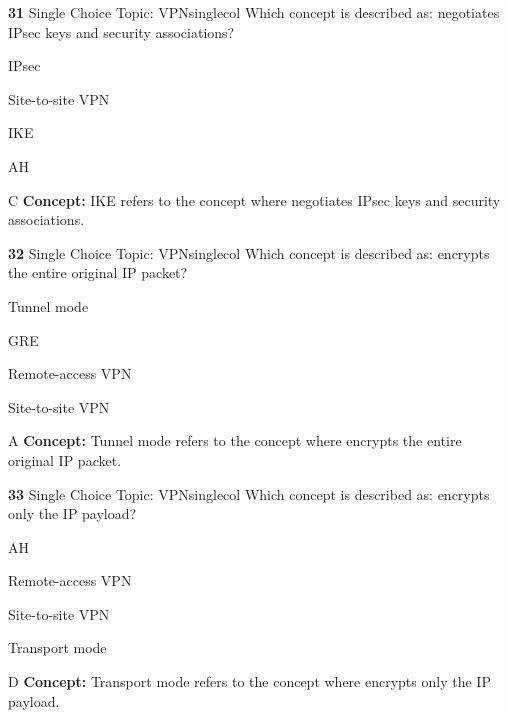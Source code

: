 \documentclass[10pt,a4paper]{article}
\begin{document}
\begin{qcard}{\color{white}\textbf{31} \hfill \small Single Choice \textbar{} Topic: VPN}{singlecol}
Which concept is described as: negotiates IPsec keys and security associations?

\begin{qoptions}
\item IPsec
\item Site-to-site VPN
\item IKE
\item AH
\end{qoptions}
\begin{explainbox}{C}
\textbf{Concept:} IKE refers to the concept where negotiates IPsec keys and security associations.
\end{explainbox}
\end{qcard}

\begin{qcard}{\color{white}\textbf{32} \hfill \small Single Choice \textbar{} Topic: VPN}{singlecol}
Which concept is described as: encrypts the entire original IP packet?

\begin{qoptions}
\item Tunnel mode
\item GRE
\item Remote-access VPN
\item Site-to-site VPN
\end{qoptions}
\begin{explainbox}{A}
\textbf{Concept:} Tunnel mode refers to the concept where encrypts the entire original IP packet.
\end{explainbox}
\end{qcard}

\begin{qcard}{\color{white}\textbf{33} \hfill \small Single Choice \textbar{} Topic: VPN}{singlecol}
Which concept is described as: encrypts only the IP payload?

\begin{qoptions}
\item AH
\item Remote-access VPN
\item Site-to-site VPN
\item Transport mode
\end{qoptions}
\begin{explainbox}{D}
\textbf{Concept:} Transport mode refers to the concept where encrypts only the IP payload.
\end{explainbox}
\end{qcard}
\end{document}
